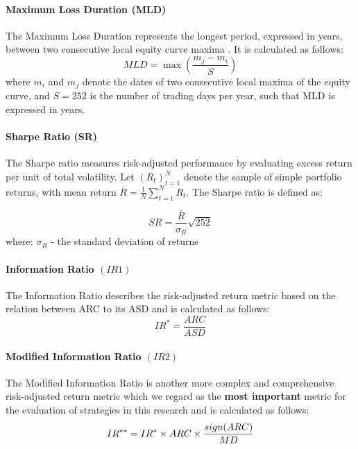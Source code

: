\documentclass[]{elsarticle}
\begin{document}
\paragraph{Maximum Loss Duration (MLD)}
The Maximum Loss Duration represents the longest period, expressed in years, between two consecutive local equity curve maxima \citep{michankow2022lstm}. It is calculated as follows:
\begin{equation}
\label{eq:mld}
MLD = \max\left(\frac{m_j - m_i}{S}\right)
\end{equation}
where $m_i$ and $m_j$ denote the dates of two consecutive local maxima of the equity curve, and $S = 252$ is the number of trading days per year, such that MLD is expressed in years.

\paragraph{Sharpe Ratio (SR)}
The Sharpe ratio measures risk-adjusted performance by evaluating excess return per unit of total volatility. Let $(R_t)_{t=1}^{N}$ denote the sample of simple portfolio returns, with mean return $\bar{R} = \frac{1}{N} \sum_{t=1}^{N} R_t$. The Sharpe ratio is defined as:

\begin{equation}
\label{eq:sharpe}
SR = \frac{\bar{R}}{\sigma_R} \sqrt{252}
\end{equation}
where: \newline $\sigma_R$ - the standard deviation of returns

\paragraph{Information Ratio \((IR1)\)}
The Information Ratio describes the risk-adjusted return
metric based on the relation between ARC to its ASD and is calculated as
follows:
\begin{equation}
\label{eq:ir-star}
IR^{*} = \frac{ARC}{ASD}
\end{equation}

\paragraph{Modified Information Ratio \((IR2)\)}
The Modified Information Ratio is another more complex and
comprehensive risk-adjusted return metric which we regard as the
\textbf{most important} metric for the evaluation of strategies in this
research and is calculated as follows:
\begin{equation}
\label{eq:ir-starstar}
IR^{**} = IR^{*}\space\times\space ARC\space\times\space\frac{sign(ARC)}{MD}
\end{equation}
\end{document}
